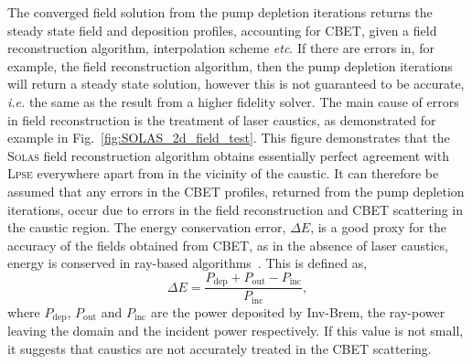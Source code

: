 The converged field solution from the pump depletion iterations returns the steady state field and deposition profiles, accounting for \ac{CBET}, given a field reconstruction algorithm, interpolation scheme \textit{etc}.
If there are errors in, for example, the field reconstruction algorithm, then the pump depletion iterations will return a steady state solution, however this is not guaranteed to be accurate, \textit{i.e.} the same as the result from a higher fidelity solver.
The main cause of errors in field reconstruction is the treatment of laser caustics, as demonstrated for example in Fig.~\ref{fig:SOLAS_2d_field_test}.
This figure demonstrates that the \textsc{Solas} field reconstruction algorithm obtains essentially perfect agreement with \textsc{Lpse} everywhere apart from in the vicinity of the caustic.
It can therefore be assumed that any errors in the \ac{CBET} profiles, returned from the pump depletion iterations, occur due to errors in the field reconstruction and \ac{CBET} scattering in the caustic region.
The energy conservation error, $\Delta E$, is a good proxy for the accuracy of the fields obtained from \ac{CBET}, as in the absence of laser caustics, energy is conserved in ray-based algorithms~\cite{follett_validation_2022}.
This is defined as,
\begin{equation}
    \Delta E = \frac{ P_{\text{dep}} + P_{\text{out}} - P_{\text{inc}} }{ P_{\text{inc}} },
\end{equation}
where $P_{\text{dep}}$, $P_{\text{out}}$ and $P_{\text{inc}}$ are the power deposited by \ac{Inv-Brem}, the ray-power leaving the domain and the incident power respectively.
If this value is not small, it suggests that caustics are not accurately treated in the \ac{CBET} scattering.

